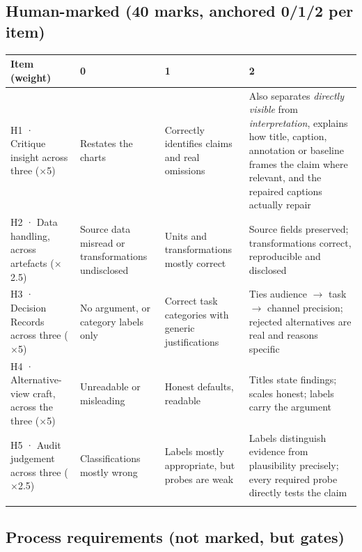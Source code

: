 \documentclass[11pt,a4paper]{article}
\begin{document}
\subsection*{Human-marked (40 marks, anchored 0/1/2 per item)}

\begin{tabularx}{\textwidth}{@{}>{\raggedright\arraybackslash}p{2.9cm} >{\raggedright\arraybackslash}X >{\raggedright\arraybackslash}X >{\raggedright\arraybackslash}X@{}}
\toprule
\textbf{Item (weight)} & \textbf{0} & \textbf{1} & \textbf{2} \\
\midrule
H1 · Critique insight across three ($\times$5) & Restates the charts & Correctly identifies claims and real omissions & Also separates \emph{directly visible} from \emph{interpretation}, explains how title, caption, annotation or baseline frames the claim where relevant, and the repaired captions actually repair \\
\addlinespace[0.45em]
H2 · Data handling, across artefacts ($\times$2.5) & Source data misread or transformations undisclosed & Units and transformations mostly correct & Source fields preserved; transformations correct, reproducible and disclosed \\
\addlinespace[0.45em]
H3 · Decision Records across three ($\times$5) & No argument, or category labels only & Correct task categories with generic justifications & Ties audience $\rightarrow$ task $\rightarrow$ channel precision; rejected alternatives are real and reasons specific \\
\addlinespace[0.45em]
H4 · Alternative-view craft, across the three ($\times$5) & Unreadable or misleading & Honest defaults, readable & Titles state findings; scales honest; labels carry the argument \\
\addlinespace[0.45em]
H5 · Audit judgement across three ($\times$2.5) & Classifications mostly wrong & Labels mostly appropriate, but probes are weak & Labels distinguish evidence from plausibility precisely; every required probe directly tests the claim \\
\midrule
\multicolumn{4}{@{}l}{\textbf{Total: 40 marks} (weights $\times$ anchor score; maximum $2\times(5+2.5+5+5+2.5)=40$)} \\
\bottomrule
\end{tabularx}

\subsection*{Process requirements (not marked, but gates)}
\end{document}
